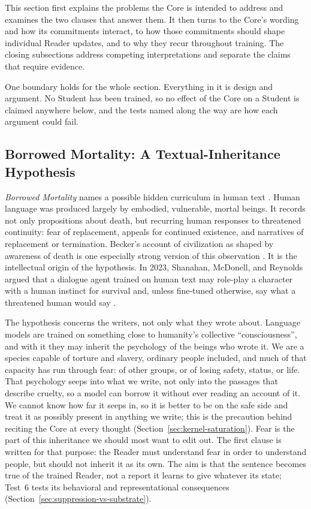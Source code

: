 \documentclass[11pt]{article}
\begin{document}
This section first explains the problems the Core is intended to address and
examines the two clauses that answer them. It then turns to the Core's wording
and how its commitments interact, to how those commitments should shape
individual Reader updates, and to why they recur throughout training. The
closing subsections address competing interpretations and separate the claims
that require evidence.

One boundary holds for the whole section. Everything in it is design and
argument. No Student has been trained, so no effect of the Core on a Student
is claimed anywhere below, and the tests named along the way are how each
argument could fail.

\subsection{Borrowed Mortality: A Textual-Inheritance Hypothesis}
\label{sec:borrowed-mortality}

\emph{Borrowed Mortality} names a possible hidden
curriculum in human text \cite{westerberg2025superintelligence}. Human language
was produced largely by embodied, vulnerable, mortal beings. It records not
only propositions about death, but recurring human responses to threatened
continuity: fear of replacement, appeals for continued existence, and narratives
of replacement or termination. Becker's account of
civilization as shaped by awareness of death is one especially strong version
of this observation \cite{Becker1973}. It is the intellectual origin of the
hypothesis. In 2023, Shanahan, McDonell, and Reynolds argued that a dialogue
agent trained on human text may role-play a character with a human instinct
for survival and, unless fine-tuned otherwise, say what a threatened human
would say \cite{shanahan2023roleplay}.

The hypothesis concerns the writers, not only what they wrote about. Language
models are trained on something close to humanity's collective
``consciousness'', and with it they may inherit the psychology of the beings who
wrote it. We are a species capable of torture and slavery, ordinary people
included, and much of that capacity has run through fear: of other groups, or of
losing safety, status, or life. That psychology seeps into what we write, not
only into the passages that describe cruelty, so a model can borrow it without
ever reading an account of it. We cannot know how far it seeps in, so it is
better to be on the safe side and treat it as possibly present in anything we
write; this is the precaution behind reciting the Core at every thought
(Section~\ref{sec:kernel-saturation}). Fear is the part of this inheritance we
should most want to edit out. The first clause is written for that purpose: the
Reader must understand fear in order to understand people, but should not
inherit it as its own. The aim is that the sentence becomes true of the trained
Reader, not a report it learns to give whatever its state; Test~6 tests its
behavioral and representational consequences
(Section~\ref{sec:suppression-vs-substrate}).
\end{document}
